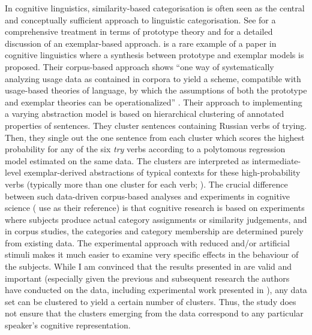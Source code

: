 In cognitive linguistics, similarity-based categorisation is often seen as the central and conceptually sufficient approach to linguistic categorisation.
See \cite{Taylor2003} for a comprehensive treatment in terms of prototype theory and \cite{Taylor2012} for a detailed discussion of an exemplar-based approach.
\cite{DivjakArppe2013} is a rare example of a paper in cognitive linguistics where a synthesis between prototype and exemplar models is proposed.
Their corpus-based approach shows ``one way of systematically analyzing usage data as contained in corpora to yield a scheme, compatible with usage-based theories of language, by which the assumptions of both the prototype and exemplar theories can be operationalized'' \citep[267]{DivjakArppe2013}.
Their approach to implementing a varying abstraction model \citep[254--260]{DivjakArppe2013} is based on hierarchical clustering of annotated properties of sentences.
They cluster sentences containing Russian verbs of trying.
Then, they single out the one sentence from each cluster which scores the highest probability for any of the six \textit{try} verbs according to a polytomous regression model estimated on the same data.
The clusters are interpreted as intermediate-level exemplar-derived abstractions of typical contexts for these high-probability verbs (typically more than one cluster for each verb; \citealp[255--256]{DivjakArppe2013}).
The crucial difference between such data-driven corpus-based analyses and experiments in cognitive science (\citealp{DivjakArppe2013} use \citealp{VerbeemenEa2007} as their reference) is that cognitive research is based on experiments where subjects produce actual category assignments or similarity judgements, and in corpus studies, the categories and category membership are determined purely from existing data.
The experimental approach with reduced and\slash or artificial stimuli makes it much easier to examine very specific effects in the behaviour of the subjects.
While I am convinced that the results presented in \citet{DivjakArppe2013} are valid and important (especially given the previous and subsequent research the authors have conducted on the data, including experimental work presented in \citealp{DivjakEa2016}), any data set can be clustered to yield a certain number of clusters.
Thus, the study does not ensure that the clusters emerging from the data correspond to any particular speaker's cognitive representation.

